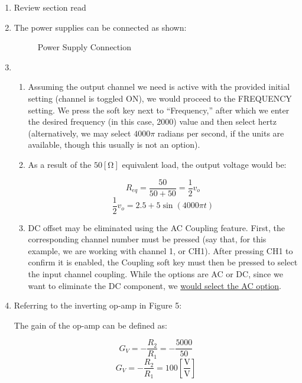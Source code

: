 \begin{enumerate}

  \item Review section read \textcolor{green}{\checkmark}

  \item The power supplies can be connected as shown:

    \begin{figure}[H]
      \centering
      
      \caption{Power Supply Connection}
      \label{fig:1}
    \end{figure}

  \item

    \begin{enumerate}

      \item Assuming the output channel we need is active with the provided initial setting (channel is toggled ON), we would proceed to the FREQUENCY setting. We press the soft key next to ``Frequency,'' after which we enter the desired frequency (in this case, 2000) value and then select hertz (alternatively, we may select $4000\pi$ radians per second, if the units are available, though this usually is not an option).

      \item As a result of the $50[\si{\ohm}]$ equivalent load, the output voltage would be:

        $$R_{eq}=\frac{50}{50+50}=\frac{1}{2}v_{o}$$
        $$\frac{1}{2}v_o=\boxed{2.5+5\sin(4000\pi t)}$$

      \item DC offset may be eliminated using the AC Coupling feature. First, the corresponding channel number must be pressed (say that, for this example, we are working with channel 1, or CH1). After pressing CH1 to confirm it is enabled, the Coupling soft key must then be pressed to select the input channel coupling. While the options are AC or DC, since we want to eliminate the DC component, we \underline{would select the AC option}.

    \end{enumerate}

  \item Referring to the inverting op-amp in Figure 5:

    \begin{center}
      The gain of the op-amp can be defined as:
    \end{center}
    $$G_V=-\frac{R_2}{R_1}=-\frac{5000}{50}$$
    $$\boxed{G_V=-\frac{R_2}{R_1}=100\left[ \frac{\si{\volt}}{\si{\volt}} \right]}$$


\end{enumerate}
